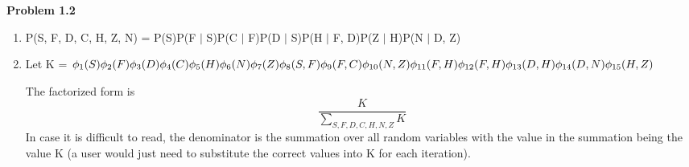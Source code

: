 \documentclass[12pt]{article}
\begin{document}
\pagebreak\textbf{Problem 1.2}
\begin{enumerate}
	\item \small P(S, F, D, C, H, Z, N) = P(S)P(F $\vert$ S)P(C $\vert$ F)P(D $\vert$ S)P(H $\vert$ F, D)P(Z $\vert$ H)P(N $\vert$ D, Z)
	\item Let K =  $\phi_1(S)\phi_2(F)\phi_3(D)\phi_4(C)\phi_5(H)\phi_6(N)\phi_7(Z)\phi_8(S, F)\phi_9(F, C)\phi_{10}(N, Z)\phi_{11}(F, H)\\\phi_{12}(F, H)\phi_{13}(D, H)\phi_{14}(D, N)\phi_{15}(H, Z)$
	
	The factorized form is $$\frac{K}{\sum_{S, F, D, C, H, N, Z} K}$$ In case it is difficult to read, the denominator is the summation over all random variables with the value in the summation being the value K (a user would just need to substitute the correct values into K for each iteration).
\end{enumerate}
\end{document}
